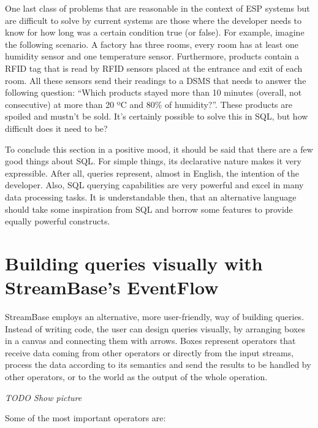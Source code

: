 \documentclass{report}
\begin{document}
One last class of problems that are reasonable in the context of ESP systems but are difficult to solve by current systems are those where the developer needs to know for how long was a certain condition true (or false). For example, imagine the following scenario. A factory has three rooms, every room has at least one humidity sensor and one temperature sensor. Furthermore, products contain a RFID tag that is read by RFID sensors placed at the entrance and exit of each room. All these sensors send their readings to a DSMS that needs to answer the following question: ``Which products stayed more than 10 minutes (overall, not consecutive) at more than 20 ºC and 80\% of humidity?''. These products are spoiled and mustn't be sold. It's certainly possible to solve this in SQL, but how difficult does it need to be?

To conclude this section in a positive mood, it should be said that there are a few good things about SQL. For simple things, its declarative nature makes it very expressible. After all, queries represent, almost in English, the intention of the developer. Also, SQL querying capabilities are very powerful and excel in many data processing tasks. It is understandable then, that an alternative language should take some inspiration from SQL and borrow some features to provide equally powerful constructs.

\section{Building queries visually with StreamBase's EventFlow}

StreamBase employs an alternative, more user-friendly, way of building queries. Instead of writing code, the user can design queries visually, by arranging boxes in a canvas and connecting them with arrows. Boxes represent operators that receive data coming from other operators or directly from the input streams, process the data according to its semantics and send the results to be handled by other operators, or to the world as the output of the whole operation.

\emph{TODO Show picture}

Some of the most important operators are:
\end{document}
